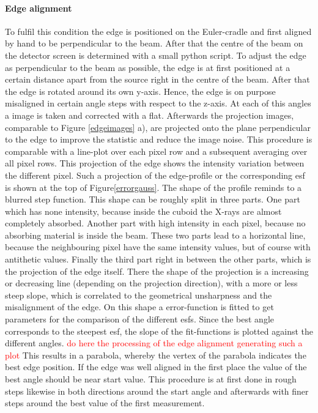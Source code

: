 \paragraph{Edge alignment} \label{alignment}
To fulfil this condition the edge is positioned on the Euler-cradle and first aligned by hand to be perpendicular to the beam. After that the centre of the beam on the detector screen is determined with a small python script. To adjust the edge as perpendicular to the beam as possible, the edge is at first positioned at a certain distance apart from the source right in the centre of the beam. After that the edge is rotated around its own y-axis. Hence, the edge is on purpose misaligned in certain angle steps with respect to the z-axis. At each of this angles a image is taken and corrected with a \gls{flat}. Afterwards the projection images, comparable to Figure \ref{edgeimages} a), are projected onto the plane perpendicular to the edge to improve the statistic and reduce the image noise. This procedure is comparable with a line-plot over each pixel row and a subsequent averaging over all pixel rows. This projection of the edge shows the intensity variation between the different pixel. Such a projection of the edge-profile or the corresponding \gls{esf} is shown at the top of Figure\ref{errorgauss}. The shape of the profile reminds to a blurred step function. This shape can be roughly split in three parts. One part which has none intensity, because inside the cuboid the X-rays are almost completely absorbed. Another part with high intensity in each pixel, because no absorbing material is inside the beam. These two parts lead to a horizontal line, because the neighbouring pixel have the same intensity values, but of course with antithetic values. Finally the third part right in between the other parts, which is the projection of the edge itself. There the shape of the projection is a increasing or decreasing line (depending on the projection direction), with a more or less steep slope, which is correlated to the geometrical unsharpness and the misalignment of the edge. On this shape a error-function is fitted to get parameters for the comparison of the different \glspl{esf}. Since the best angle corresponds to the steepest \gls{esf}, the slope of the fit-functions is plotted against the different angles. \textcolor{red}{do here the processing of the edge alignment generating such a plot} This results in a parabola, whereby the vertex of the parabola indicates the best edge position. If the edge was well aligned in the first place the value of the best angle should be near start value. This procedure is at first done in rough steps likewise in both directions around the start angle and afterwards with finer steps around the best value of the first measurement. 

